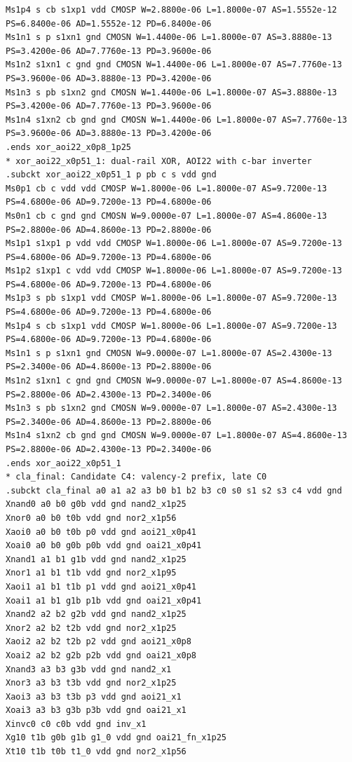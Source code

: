 \documentclass[10pt,a4paper]{article}
\begin{document}
{\begin{verbatim}
Ms1p4 s cb s1xp1 vdd CMOSP W=2.8800e-06 L=1.8000e-07 AS=1.5552e-12 PS=6.8400e-06 AD=1.5552e-12 PD=6.8400e-06
Ms1n1 s p s1xn1 gnd CMOSN W=1.4400e-06 L=1.8000e-07 AS=3.8880e-13 PS=3.4200e-06 AD=7.7760e-13 PD=3.9600e-06
Ms1n2 s1xn1 c gnd gnd CMOSN W=1.4400e-06 L=1.8000e-07 AS=7.7760e-13 PS=3.9600e-06 AD=3.8880e-13 PD=3.4200e-06
Ms1n3 s pb s1xn2 gnd CMOSN W=1.4400e-06 L=1.8000e-07 AS=3.8880e-13 PS=3.4200e-06 AD=7.7760e-13 PD=3.9600e-06
Ms1n4 s1xn2 cb gnd gnd CMOSN W=1.4400e-06 L=1.8000e-07 AS=7.7760e-13 PS=3.9600e-06 AD=3.8880e-13 PD=3.4200e-06
.ends xor_aoi22_x0p8_1p25
* xor_aoi22_x0p51_1: dual-rail XOR, AOI22 with c-bar inverter
.subckt xor_aoi22_x0p51_1 p pb c s vdd gnd
Ms0p1 cb c vdd vdd CMOSP W=1.8000e-06 L=1.8000e-07 AS=9.7200e-13 PS=4.6800e-06 AD=9.7200e-13 PD=4.6800e-06
Ms0n1 cb c gnd gnd CMOSN W=9.0000e-07 L=1.8000e-07 AS=4.8600e-13 PS=2.8800e-06 AD=4.8600e-13 PD=2.8800e-06
Ms1p1 s1xp1 p vdd vdd CMOSP W=1.8000e-06 L=1.8000e-07 AS=9.7200e-13 PS=4.6800e-06 AD=9.7200e-13 PD=4.6800e-06
Ms1p2 s1xp1 c vdd vdd CMOSP W=1.8000e-06 L=1.8000e-07 AS=9.7200e-13 PS=4.6800e-06 AD=9.7200e-13 PD=4.6800e-06
Ms1p3 s pb s1xp1 vdd CMOSP W=1.8000e-06 L=1.8000e-07 AS=9.7200e-13 PS=4.6800e-06 AD=9.7200e-13 PD=4.6800e-06
Ms1p4 s cb s1xp1 vdd CMOSP W=1.8000e-06 L=1.8000e-07 AS=9.7200e-13 PS=4.6800e-06 AD=9.7200e-13 PD=4.6800e-06
Ms1n1 s p s1xn1 gnd CMOSN W=9.0000e-07 L=1.8000e-07 AS=2.4300e-13 PS=2.3400e-06 AD=4.8600e-13 PD=2.8800e-06
Ms1n2 s1xn1 c gnd gnd CMOSN W=9.0000e-07 L=1.8000e-07 AS=4.8600e-13 PS=2.8800e-06 AD=2.4300e-13 PD=2.3400e-06
Ms1n3 s pb s1xn2 gnd CMOSN W=9.0000e-07 L=1.8000e-07 AS=2.4300e-13 PS=2.3400e-06 AD=4.8600e-13 PD=2.8800e-06
Ms1n4 s1xn2 cb gnd gnd CMOSN W=9.0000e-07 L=1.8000e-07 AS=4.8600e-13 PS=2.8800e-06 AD=2.4300e-13 PD=2.3400e-06
.ends xor_aoi22_x0p51_1
* cla_final: Candidate C4: valency-2 prefix, late C0
.subckt cla_final a0 a1 a2 a3 b0 b1 b2 b3 c0 s0 s1 s2 s3 c4 vdd gnd
Xnand0 a0 b0 g0b vdd gnd nand2_x1p25
Xnor0 a0 b0 t0b vdd gnd nor2_x1p56
Xaoi0 a0 b0 t0b p0 vdd gnd aoi21_x0p41
Xoai0 a0 b0 g0b p0b vdd gnd oai21_x0p41
Xnand1 a1 b1 g1b vdd gnd nand2_x1p25
Xnor1 a1 b1 t1b vdd gnd nor2_x1p95
Xaoi1 a1 b1 t1b p1 vdd gnd aoi21_x0p41
Xoai1 a1 b1 g1b p1b vdd gnd oai21_x0p41
Xnand2 a2 b2 g2b vdd gnd nand2_x1p25
Xnor2 a2 b2 t2b vdd gnd nor2_x1p25
Xaoi2 a2 b2 t2b p2 vdd gnd aoi21_x0p8
Xoai2 a2 b2 g2b p2b vdd gnd oai21_x0p8
Xnand3 a3 b3 g3b vdd gnd nand2_x1
Xnor3 a3 b3 t3b vdd gnd nor2_x1p25
Xaoi3 a3 b3 t3b p3 vdd gnd aoi21_x1
Xoai3 a3 b3 g3b p3b vdd gnd oai21_x1
Xinvc0 c0 c0b vdd gnd inv_x1
Xg10 t1b g0b g1b g1_0 vdd gnd oai21_fn_x1p25
Xt10 t1b t0b t1_0 vdd gnd nor2_x1p56

\end{verbatim}}
\end{document}
